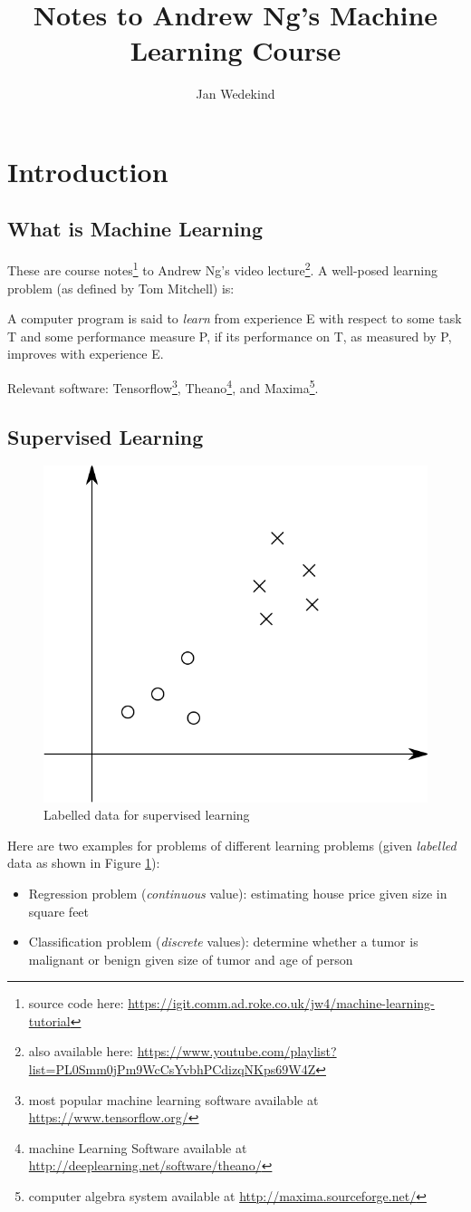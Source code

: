 \documentclass[a4paper,twoside,10pt]{article}
\title{Notes to Andrew Ng's Machine Learning Course}
\author{Jan Wedekind}
\begin{document}
\maketitle

\section{Introduction}

\subsection{What is Machine Learning}
These are course notes\footnote{source code here: \url{https://igit.comm.ad.roke.co.uk/jw4/machine-learning-tutorial}} to Andrew Ng's video lecture\citep{andrewng,andrewng2}\footnote{also available here: \url{https://www.youtube.com/playlist?list=PL0Smm0jPm9WcCsYvbhPCdizqNKps69W4Z}}.
A well-posed learning problem (as defined by Tom Mitchell) is:
\begin{displayquote}
  A computer program is said to \emph{learn} from experience E with respect to some task T and some performance measure P, if its performance on T, as measured by P, improves with experience E.
\end{displayquote}

Relevant software: Tensorflow\footnote{most popular machine learning software available at \url{https://www.tensorflow.org/}},
Theano\footnote{machine Learning Software available at \url{http://deeplearning.net/software/theano/}},
and Maxima\footnote{computer algebra system available at \url{http://maxima.sourceforge.net/}}.

\subsection{Supervised Learning}
\begin{figure}[htbp]
  \begin{center}
    \includegraphics[width=.4\textwidth]{supervised}
    \caption{Labelled data for supervised learning\label{fig:supervised}}
  \end{center}
\end{figure}
Here are two examples for problems of different learning problems (given \emph{labelled} data as shown in Figure \ref{fig:supervised}):
\begin{itemize}
  \item Regression problem (\emph{continuous} value): estimating house price given size in square feet
  \item Classification problem (\emph{discrete} values): determine whether a tumor is malignant or benign given size of tumor and age of person
\end{itemize}
\end{document}
